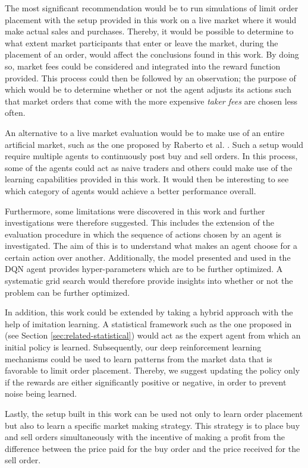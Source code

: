 The most significant recommendation would be to run simulations of limit order placement with the setup provided in this work on a live market where it would make actual sales and purchases.
Thereby, it would be possible to determine to what extent market participants that enter or leave the market, during the placement of an order, would affect the conclusions found in this work.
By doing so, market fees could be considered and integrated into the reward function provided. 
This process could then be followed by an observation; the purpose of which would be to determine whether or not the agent adjusts its actions such that market orders that come with the more expensive \textit{taker fees} are chosen less often.

An alternative to a live market evaluation would be to make use of an entire artificial market, such as the one proposed by Raberto et al. \cite{raberto2005price}. 
Such a setup would require multiple agents to continuously post buy and sell orders.
In this process, some of the agents could act as naive traders and others could make use of the learning capabilities provided in this work.
It would then be interesting to see which category of agents would achieve a better performance overall.

Furthermore, some limitations were discovered in this work and further investigations were therefore suggested.
This includes the extension of the evaluation procedure in which the sequence of actions chosen by an agent is investigated.
The aim of this is to understand what makes an agent choose for a certain action over another.
Additionally, the model presented and used in the DQN agent provides hyper-parameters which are to be further optimized.
A systematic grid search would therefore provide insights into whether or not the problem can be further optimized.

In addition, this work could be extended by taking a hybrid approach with the help of imitation learning.
A statistical framework such as the one proposed in \cite{yingsaeree2012algorithmic} (see Section \ref{sec:related-statistical}) would act as the expert agent from which an initial policy is learned.
Subsequently, our deep reinforcement learning mechanisms could be used to learn patterns from the market data that is favorable to limit order placement.
Thereby, we suggest updating the policy only if the rewards are either significantly positive or negative, in order to prevent  noise being learned.

Lastly, the setup built in this work can be used not only to learn order placement but also to learn a specific market making\cite{o1986microeconomics} strategy.
This strategy is to place buy and sell orders simultaneously with the incentive of making a profit from the difference between the price paid for the buy order and the price received for the sell order.

